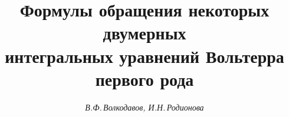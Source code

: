 

 




 


\newcommand{\tts}[1]{} 


 




  


\setcounter{page}{30} 












\author{\it В.Ф.\,Волкодавов, И.Н.\,Родионова} 




\title{Формулы обращения некоторых двумерных\\ 


интегральных уравнений Вольтерра первого рода} 


 


\date{} 




 


\pagestyle{plain} %


 


 




 


